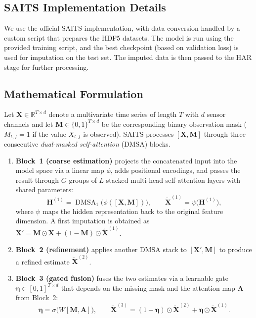 \subsection{SAITS Implementation Details}

\hspace{2em}We use the official SAITS implementation, with data conversion handled by a custom script that prepares the HDF5 datasets. The model is run using the provided training script, and the best checkpoint (based on validation loss) is used for imputation on the test set. The imputed data is then passed to the HAR stage for further processing.

\subsection{Mathematical Formulation}

\hspace{2em}Let $\mathbf{X}\in\mathbb{R}^{T\times d}$ denote a multivariate time series of length $T$ with $d$ sensor channels and let $\mathbf{M}\in\{0,1\}^{T\times d}$ be the corresponding binary observation mask ($M_{t,f}=1$ if the value $X_{t,f}$ is observed). SAITS processes $[\mathbf{X},\mathbf{M}]$ through three consecutive \emph{dual-masked self-attention} (DMSA) blocks.

\begin{enumerate}
    \item \textbf{Block~1 (coarse estimation)} projects the concatenated input into the model space via a linear map $\phi$, adds positional encodings, and passes the result through $G$ groups of $L$ stacked multi-head self-attention layers with shared parameters:
    \[
        \mathbf{H}^{(1)}=\operatorname{DMSA}_1\!\bigl(\phi([\mathbf{X},\mathbf{M}])\bigr),\qquad
        \mathbf{\tilde X}^{(1)}=\psi\bigl(\mathbf{H}^{(1)}\bigr),
    \]
    where $\psi$ maps the hidden representation back to the original feature dimension.  A first imputation is obtained as $\mathbf{X}'=\mathbf{M}\odot\mathbf{X}+(1-\mathbf{M})\odot\mathbf{\tilde X}^{(1)}$.
    \item \textbf{Block~2 (refinement)} applies another DMSA stack to $[\mathbf{X}',\mathbf{M}]$ to produce a refined estimate $\mathbf{\tilde X}^{(2)}$.
    \item \textbf{Block~3 (gated fusion)} fuses the two estimates via a learnable gate $\boldsymbol{\eta}\in[0,1]^{T\times d}$ that depends on the missing mask and the attention map $\mathbf{A}$ from Block~2:
    \[
        \boldsymbol{\eta}=\sigma\bigl(W[\mathbf{M},\mathbf{A}]\bigr),\qquad
        \mathbf{\tilde X}^{(3)}=(1-\boldsymbol{\eta})\odot\mathbf{\tilde X}^{(2)}+\boldsymbol{\eta}\odot\mathbf{\tilde X}^{(1)}.
    \]
\end{enumerate}

